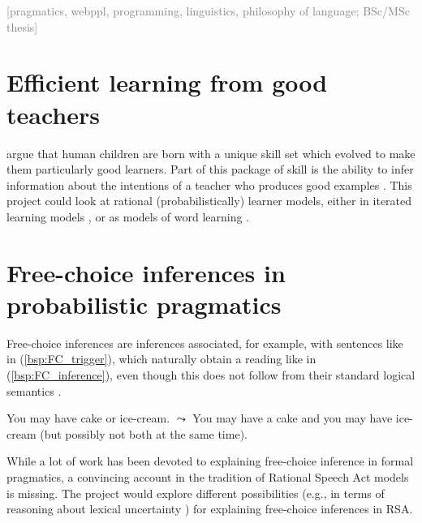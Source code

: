 \documentclass[fleqn,reqno,10pt]{article}
\newcommand{\scope}[1]{\hfill\textcolor{gray}{[#1]}}
\begin{document}
\scope{pragmatics, webppl, programming, linguistics, philosophy of language; BSc/MSc thesis}

\section{Efficient learning from good teachers}

\citet{CsibraGergely2011:Natural-Pedagog} argue that human children are born with a unique
skill set which evolved to make them particularly good learners. Part of this package of skill
is the ability to infer information about the intentions of a teacher who produces good examples
\citep{ShaftoGoodman2014:A-rational-acco}. This project could look at rational
(probabilistically) learner models, either in iterated learning models
\citet{KirbyGriffith2014:Iterated-Learni}, or as models of word learning
\citep{FrankGoodman2014:Inferring-word-}. 

\section{Free-choice inferences in probabilistic pragmatics}

Free-choice inferences are inferences associated, for example, with sentences like in
(\ref{bsp:FC_trigger}), which naturally obtain a reading like in (\ref{bsp:FC_inference}), even
though this does not follow from their standard logical semantics
\cite{KampFreeChoice1973,KampFreeChoice1978,ZimmermannFreeChoiceDisjunction2000,Fox2007:Free-Choice-and}. 

\begin{exe}
  \ex
  \begin{xlist}
    \ex \label{bsp:FC_trigger} You may have cake or ice-cream.
    \ex \label{bsp:FC_inference} $\leadsto$ You may have a cake and you may have
    ice-cream (but possibly not both at the same time).
  \end{xlist}
\end{exe}

While a lot of work has been devoted to explaining free-choice inference in formal pragmatics,
a convincing account in the tradition of Rational Speech Act models
\cite{FrankGoodman2012:Predicting-Prag} is missing. The project would explore different
possibilities (e.g., in terms of reasoning about lexical uncertainty
\cite{BergenLevy2014:Pragmatic-Reaso}) for explaining free-choice inferences in RSA.

\printbibliography[heading=bibintoc]
\end{document}
